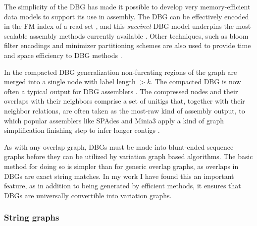 The simplicity of the DBG has made it possible to develop very memory-efficient data models to support its use in assembly.
The DBG can be effectively encoded in the FM-index of a read set \cite{bowe2012succinct}, and this \emph{succinct} DBG model underpins the most-scalable assembly methods currently available \cite{li2015megahit}.
Other techniques, such as bloom filter encodings and minimizer partitioning schemes are also used to provide time and space efficiency to DBG methods \cite{chikhi2012space, chikhi2016compacting}.

In the compacted DBG generalization non-furcating regions of the graph are merged into a single node with label length $>k$.
The compacted DBG is now often a typical output for DBG assemblers \cite{chikhi2016compacting,minkin2016twopaco}.
The compressed nodes and their overlaps with their neighbors comprise a set of unitigs that, together with their neighbor relations, are often taken as the most-raw kind of assembly output, to which popular assemblers like SPAdes and Minia3 apply a kind of graph simplification finishing step to infer longer contigs \cite{bankevich2012spades}.

As with any overlap graph, DBGs must be made into blunt-ended sequence graphs before they can be utilized by variation graph based algorithms.
The basic method for doing so is simpler than for generic overlap graphs, as overlaps in DBGs are exact string matches.
In my work I have found this an important feature, as in addition to being generated by efficient methods, it ensures that DBGs are universally convertible into variation graphs.

\subsubsection{String graphs}
\label{sec:string_graphs}

